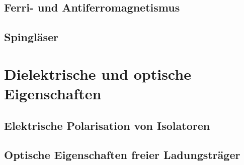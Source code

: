 \documentclass[a4paper,12pt]{article}
\begin{document}
\subsection{Ferri- und Antiferromagnetismus}
\subsection{Spingläser}
\section{Dielektrische und optische Eigenschaften}
\subsection{Elektrische Polarisation von Isolatoren}
\subsection{Optische Eigenschaften freier Ladungsträger}
\end{document}
